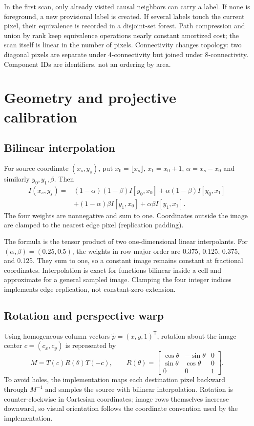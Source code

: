\documentclass[11pt,a4paper]{article}
\newcommand{\1}{\mathbf{1}}
\begin{document}
In the first scan, only already visited causal neighbors can carry a label. If
none is foreground, a new provisional label is created. If several labels
touch the current pixel, their equivalence is recorded in a disjoint-set
forest. Path compression and union by rank keep equivalence operations nearly
constant amortized cost; the scan itself is linear in the number of pixels.
Connectivity changes topology: two diagonal pixels are separate under
4-connectivity but joined under 8-connectivity. Component IDs are identifiers,
not an ordering by area.

\section{Geometry and projective calibration}

\subsection{Bilinear interpolation}

For source coordinate $(x_s,y_s)$, put $x_0=\lfloor x_s\rfloor$,
$x_1=x_0+1$, $\alpha=x_s-x_0$ and similarly $y_0,y_1,\beta$. Then
\begin{align*}
I(x_s,y_s)={}&(1-\alpha)(1-\beta)I[y_0,x_0]
+\alpha(1-\beta)I[y_0,x_1]\\
&+(1-\alpha)\beta I[y_1,x_0]
+\alpha\beta I[y_1,x_1].
\end{align*}
The four weights are nonnegative and sum to one. Coordinates outside the image
are clamped to the nearest edge pixel (replication padding).

The formula is the tensor product of two one-dimensional linear interpolants.
For $(\alpha,\beta)=(0.25,0.5)$, the weights in row-major order are 0.375,
0.125, 0.375, and 0.125. They sum to one, so a constant image remains constant
at fractional coordinates. Interpolation is exact for functions bilinear
inside a cell and approximate for a general sampled image. Clamping the four
integer indices implements edge replication, not constant-zero extension.

\subsection{Rotation and perspective warp}

Using homogeneous column vectors $\tilde p=(x,y,1)^{\mathsf T}$, rotation about
the image center $c=(c_x,c_y)$ is represented by
\[
 M=T(c)R(\theta)T(-c),\qquad
 R(\theta)=\begin{bmatrix}\cos\theta&-\sin\theta&0\\
 \sin\theta&\cos\theta&0\\0&0&1\end{bmatrix}.
\]
To avoid holes, the implementation maps each destination pixel backward through
$M^{-1}$ and samples the source with bilinear interpolation. Rotation is
counter-clockwise in Cartesian coordinates; image rows themselves increase
downward, so visual orientation follows the coordinate convention used by the
implementation.
\end{document}
